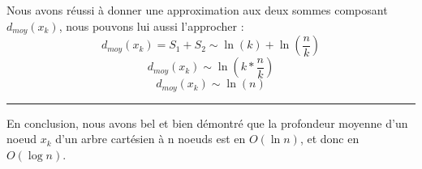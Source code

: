 \documentclass[a4paper,12pt]{report}
\begin{document}
\begin{tcolorbox}[colback=gray!10, colframe=blue!30, coltitle=black, title=Réponse à la 6.c - 3/3]

    Nous avons réussi à donner une approximation aux deux sommes composant \(d_{moy}(x_k)\), nous pouvons lui aussi l'approcher :
    \[ d_{moy}(x_k) = S_1 + S_2 \sim \ln(k) + \ln(\frac{n}{k}) \]
    \[ d_{moy}(x_k) \sim \ln(k * \frac{n}{k}) \]
    \[ d_{moy}(x_k) \sim \ln(n) \]

    \vspace{0.5cm}
    \hrule
    \vspace{0.5cm}

    En conclusion, nous avons bel et bien démontré que la profondeur moyenne d'un noeud \( x_k \) d'un arbre cartésien à n noeuds est en \( O(\ln n)\), et 
        donc en \( O(\log n) \).

\end{tcolorbox}
\end{document}
